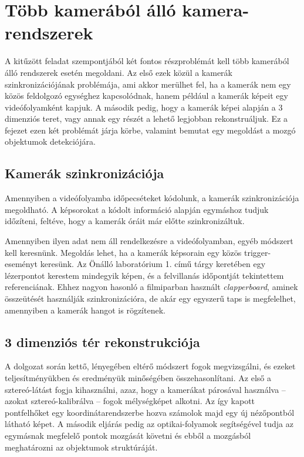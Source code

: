 \chapter{Több kamerából álló kamera-rendszerek}

A kitűzött feladat szempontjából két fontos részproblémát kell több kamerából álló rendszerek esetén megoldani. Az első ezek közül a kamerák szinkronizációjának problémája, ami akkor merülhet fel, ha a kamerák nem egy közös feldolgozó egységhez kapcsolódnak, hanem például a kamerák képeit egy videófolyamként kapjuk. A második pedig, hogy a kamerák képei alapján a 3 dimenziós teret, vagy annak egy részét a lehető legjobban rekonstruáljuk. Ez a fejezet ezen két problémát járja körbe, valamint bemutat egy megoldást a mozgó objektumok detekciójára.

\section{Kamerák szinkronizációja}

Amennyiben a videófolyamba időpecséteket kódolunk, a kamerák szinkronizációja megoldható. A képsorokat a kódolt információ alapján egymáshoz tudjuk időzíteni, feltéve, hogy a kamerák óráit már előtte szinkronizáltuk.

Amennyiben ilyen adat nem áll rendelkezésre a videófolyamban, egyéb módszert kell keresnünk. Megoldás lehet, ha a kamerák képsorain egy közös trigger-eseményt keresünk. Az Önálló laboratórium 1. című tárgy keretében \cite{onlab-1} egy lézerpontot kerestem mindegyik képen, és a felvillanás időpontját tekintettem referenciának. Ehhez nagyon hasonló a filmiparban használt \textit{clapperboard}, aminek összeütését használják szinkronizációra, de akár egy egyszerű taps is megfelelhet, amennyiben a kamerák hangot is rögzítenek.

\section{3 dimenziós tér rekonstrukciója \label{sec:methods}}

A dolgozat során kettő, lényegében eltérő módszert fogok megvizsgálni, és ezeket teljesítményükben és eredményük minőségében összehasonlítani. Az első a sztereó-látást fogja kihasználni, azaz, hogy a kamerákat párosával használva -- azokat sztereó-kalibrálva -- fogok mélységképet alkotni. Az így kapott pontfelhőket egy koordinátarendszerbe hozva számolok majd egy új nézőpontból látható képet. A második eljárás pedig az optikai-folyamok segítségével tudja az egymásnak megfelelő pontok mozgását követni és ebből a mozgásból meghatározni az objektumok struktúráját.

